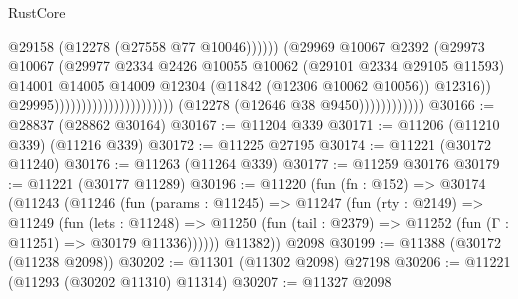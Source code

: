 \begin{lexlean}{RustCore}
\begin{coremodule}
                                                                          @29158
                                                                          (@12278
                                                                            (@27558 @77 @10046))))))
                                                                  (@29969
                                                                    @10067
                                                                    @2392
                                                                    (@29973
                                                                      @10067
                                                                      (@29977
                                                                        @2334
                                                                        @2426
                                                                        @10055
                                                                        @10062
                                                                        (@29101 @2334 @29105 @11593)
                                                                        @14001
                                                                        @14005
                                                                        @14009
                                                                        @12304
                                                                        (@11842
                                                                          (@12306 @10062 @10056))
                                                                        @12316))
                                                                    @29995))))))))))))))))))))))
                        (@12278 (@12646 @38 @9450))))))))))))
@30166 := @28837 (@28862 @30164)
@30167 := @11204 @339
@30171 := @11206 (@11210 @339) (@11216 @339)
@30172 := @11225 @27195
@30174 := @11221 (@30172 @11240)
@30176 := @11263 (@11264 @339)
@30177 := @11259 @30176
@30179 := @11221 (@30177 @11289)
@30196 := @11220
    (fun (fn : @152) =>
    @30174
      (@11243
        (@11246
          (fun (params : @11245) =>
          @11247
            (fun (rty : @2149) =>
            @11249
              (fun (lets : @11248) =>
              @11250 (fun (tail : @2379) => @11252 (fun (Γ : @11251) => @30179 @11336))))))
        @11382))
    @2098
@30199 := @11388 (@30172 (@11238 @2098))
@30202 := @11301 (@11302 @2098) @27198
@30206 := @11221 (@11293 (@30202 @11310) @11314)
@30207 := @11327 @2098

\end{coremodule}
\end{lexlean}
